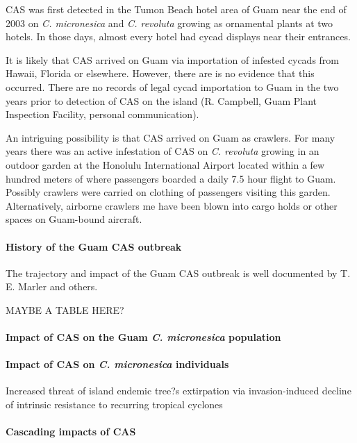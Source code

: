 \documentclass[12pt,letterpaper,english,bibliography=totocnumbered, abstract=on]{scrartcl}
\begin{document}
CAS was first detected in the Tumon Beach hotel area of Guam near the end of 2003 on \textit{C. micronesica} and \textit{C. revoluta} growing as ornamental plants at two hotels. In those days, almost every hotel had cycad displays near their entrances.

It is likely that CAS arrived on Guam via importation of infested cycads from Hawaii, Florida or elsewhere. However, there are is no evidence that this occurred. There are no records of legal cycad importation to Guam in the two years prior to detection of CAS on the island (R. Campbell, Guam Plant Inspection Facility, personal communication).  

An intriguing possibility is that CAS arrived on Guam as crawlers. For many years there was an active infestation of CAS on \textit{C. revoluta} growing in an outdoor garden at the Honolulu International Airport located within a few hundred meters of where passengers boarded a daily 7.5 hour flight to Guam. Possibly crawlers were carried on clothing of passengers visiting this garden. Alternatively, airborne crawlers me have been blown into cargo holds or other spaces on Guam-bound aircraft.

\paragraph{History of the Guam CAS outbreak}

The trajectory and impact of the Guam CAS outbreak is well documented by T. E. Marler and others.

MAYBE A TABLE HERE?

\paragraph{Impact of CAS on the Guam \textit{C. micronesica} population}

\paragraph{Impact of CAS on \textit{C. micronesica} individuals}

Increased threat of island endemic tree?s
extirpation via invasion-induced decline of
intrinsic resistance to recurring tropical cyclones

\paragraph{Cascading impacts of CAS}
\end{document}
